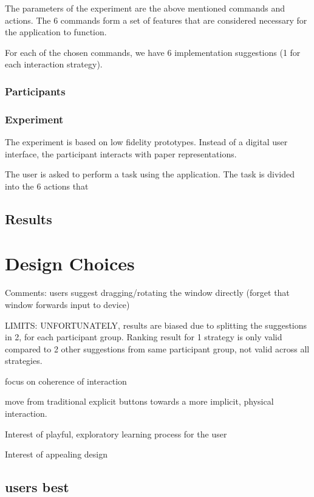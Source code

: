 The parameters of the experiment are the above mentioned commands and actions.
The 6 commands form a set of features that are considered necessary for the application to function.

For each of the chosen commands, we have 6 implementation suggestions (1 for each interaction strategy).

\subsubsection{Participants}


\subsubsection{Experiment}

The experiment is based on low fidelity prototypes.
Instead of a digital user interface, the participant interacts with paper representations.

The user is asked to perform a task using the application.
The task is divided into the 6 actions that 


\subsection{Results}

\section{Design Choices}

Comments:
users suggest dragging/rotating the window directly (forget that window forwards input to device)

LIMITS:
UNFORTUNATELY, results are biased due to splitting the suggestions in 2, for each participant group.
Ranking result for 1 strategy is only valid compared to 2 other suggestions from same participant group, not valid across all strategies.

focus on coherence of interaction

move from traditional explicit buttons towards a more implicit, physical interaction.

Interest of playful, exploratory learning process for the user

Interest of appealing design

\subsection{users best}

